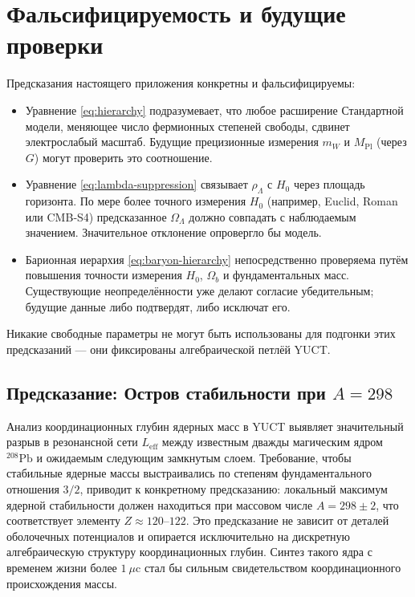 \documentclass[11pt,a4paper]{article}
\theoremstyle{remark}
\begin{document}
	
	\section{Фальсифицируемость и будущие проверки}
	
	Предсказания настоящего приложения конкретны и фальсифицируемы:
	\begin{itemize}
		\item Уравнение \eqref{eq:hierarchy} подразумевает, что любое расширение Стандартной модели, меняющее число фермионных степеней свободы, сдвинет электрослабый масштаб. Будущие прецизионные измерения \(m_W\) и \(M_{\mathrm{Pl}}\) (через \(G\)) могут проверить это соотношение.
		\item Уравнение \eqref{eq:lambda-suppression} связывает \(\rho_\Lambda\) с \(H_0\) через площадь горизонта. По мере более точного измерения \(H_0\) (например, Euclid, Roman или CMB‑S4) предсказанное \(\Omega_\Lambda\) должно совпадать с наблюдаемым значением. Значительное отклонение опровергло бы модель.
		\item Барионная иерархия \eqref{eq:baryon-hierarchy} непосредственно проверяема путём повышения точности измерения \(H_0\), \(\Omega_b\) и фундаментальных масс. Существующие неопределённости уже делают согласие убедительным; будущие данные либо подтвердят, либо исключат его.
	\end{itemize}
	Никакие свободные параметры не могут быть использованы для подгонки этих предсказаний — они фиксированы алгебраической петлёй YUCT.
	
	\subsection{Предсказание: Остров стабильности при \(A=298\)}
	
	Анализ координационных глубин ядерных масс в YUCT выявляет значительный разрыв в резонансной сети \(L_{\mathrm{eff}}\) между известным дважды магическим ядром \(^{208}\mathrm{Pb}\) и ожидаемым следующим замкнутым слоем. Требование, чтобы стабильные ядерные массы выстраивались по степеням фундаментального отношения \(3/2\), приводит к конкретному предсказанию: локальный максимум ядерной стабильности должен находиться при массовом числе \(A = 298 \pm 2\), что соответствует элементу \(Z \approx 120\)--\(122\). Это предсказание не зависит от деталей оболочечных потенциалов и опирается исключительно на дискретную алгебраическую структуру координационных глубин. Синтез такого ядра с временем жизни более \(1\ \mu\text{c}\) стал бы сильным свидетельством координационного происхождения массы.
	
\end{document}
